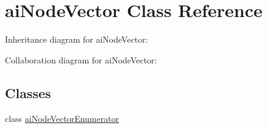 \hypertarget{classai_node_vector}{\section{ai\+Node\+Vector Class Reference}
\label{classai_node_vector}
}


Inheritance diagram for ai\+Node\+Vector\+:


Collaboration diagram for ai\+Node\+Vector\+:
\subsection*{Classes}
\begin{DoxyCompactItemize}
\item 
class \hyperlink{classai_node_vector_1_1ai_node_vector_enumerator}{ai\+Node\+Vector\+Enumerator}
\end{DoxyCompactItemize}
